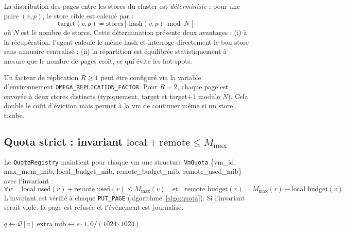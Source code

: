 La distribution des pages entre les stores du cluster est \emph{déterministe} : pour une paire $(v, p)$, le store cible est calculé par :
$$\text{target}(v, p) = \text{stores}[\,\mathrm{hash}(v, p) \bmod N\,]$$
où $N$ est le nombre de stores. Cette détermination présente deux avantages : (i) à la récupération, l'agent calcule le même hash et interroge directement le bon store sans annuaire centralisé ; (ii) la répartition est équilibrée statistiquement à mesure que le nombre de pages croît, ce qui évite les hot-spots.

Un facteur de réplication $R \ge 1$ peut être configuré via la variable d'environnement \texttt{OMEGA\_REPLICATION\_FACTOR}. Pour $R=2$, chaque page est envoyée à deux stores distincts (typiquement, target et target+1 modulo $N$). Cela double le coût d'éviction mais permet à la \acrshort{vm} de continuer même si un store tombe.

\subsection{Quota strict : invariant \(\text{local} + \text{remote} \le M_{\max}\)}

Le \texttt{QuotaRegistry} maintient pour chaque \acrshort{vm} une structure \texttt{VmQuota} \{vm\_id, max\_mem\_mib, local\_budget\_mib, remote\_budget\_mib, remote\_used\_mib\} avec l'invariant :
$$\forall v: \quad \mathrm{local\_used}(v) + \mathrm{remote\_used}(v) \le M_{\max}(v) \quad \text{et} \quad \mathrm{remote\_budget}(v) = M_{\max}(v) - \mathrm{local\_budget}(v)$$
L'invariant est vérifié à chaque \texttt{PUT\_PAGE} (algorithme~\ref{algo:quota}). Si l'invariant serait violé, la page est refusée et l'événement est journalisé.

\begin{algorithm}[H]
\caption{Vérification du quota à l'admission d'une page (\texttt{Quota::check\_put})}
\label{algo:quota}
$q \gets \mathcal{Q}[v]$\;
$\text{extra\_mib} \gets s \cdot 1{,}0 / (1024 \cdot 1024)$\;
\end{algorithm}

